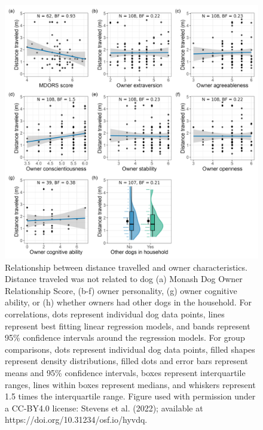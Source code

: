\documentclass[
  doc]{apa6}
\begin{document}
\begin{figure}

{\centering \includegraphics[width=0.95\linewidth]{figures/owner_characteristics} 

}

\caption{Relationship between distance travelled and owner characteristics. Distance traveled was not related to dog (a) Monash Dog Owner Relationship Score, (b-f) owner personality, (g) owner cognitive ability, or (h) whether owners had other dogs in the household. For correlations, dots represent individual dog data points, lines represent best fitting linear regression models, and bands represent 95\% confidence intervals around the regression models. For group comparisons, dots represent individual dog data points, filled shapes represent density distributions, filled dots and error bars represent means and 95\% confidence intervals, boxes represent interquartile ranges, lines within boxes represent medians, and whiskers represent 1.5 times the interquartile range.  Figure used with permission under a CC-BY4.0 license: Stevens et al. (2022); available at https://doi.org/10.31234/osf.io/hyvdq.}\label{fig:owner-char}
\end{figure}
\end{document}
